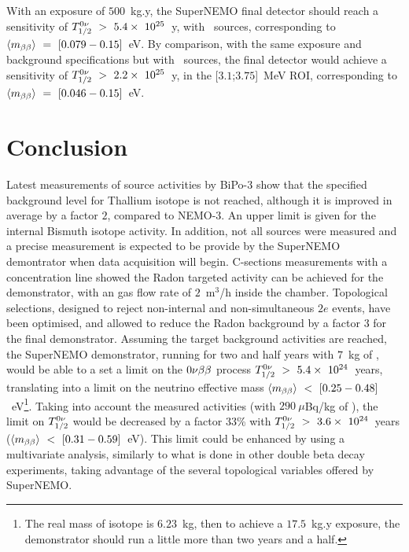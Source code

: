 With an exposure of $500$~kg.y, the SuperNEMO final detector should reach a sensitivity of $T_{1/2}^{0\nu}~>~5.4\times~10^{25}$~y, with \Se\ sources, corresponding to $\langle m_{\beta\beta}\rangle~=~[0.079-0.15]$~eV.
By comparison, with the same exposure and background specifications but with \Nd\ sources, the final detector would achieve a sensitivity of $T_{1/2}^{0\nu}~>~2.2\times~10^{25}$~y, in the [$3.1$;$3.75$]~MeV ROI, corresponding to $\langle m_{\beta\beta}\rangle~=~[0.046-0.15]$~eV.


\section{Conclusion}

Latest measurements of source activities by BiPo-$3$ show that the specified background level for Thallium isotope is not reached, although it is improved in average by a factor $2$, compared to NEMO-$3$.
An upper limit is given for the internal Bismuth isotope activity.
In addition, not all sources were measured and a precise measurement is expected to be provide by the SuperNEMO demontrator when data acquisition will begin.
C-sections measurements with a concentration line showed the Radon targeted activity can be achieved for the demonstrator, with an gas flow rate of $2$~m$^{3}$/h inside the chamber.
Topological selections, designed to reject non-internal and non-simultaneous $2e$ events, have been optimised, and allowed to reduce the Radon background by a factor $3$ for the final demonstrator.
Assuming the target background activities are reached, the SuperNEMO demonstrator, running for two and half years with $7$~kg of \Se, would be able to a set a limit on the $0\nu\beta\beta$ process $T_{1/2}^{0\nu}~>~5.4\times~10^{24}$~years, translating into a limit on the neutrino effective mass $\langle m_{\beta\beta}\rangle~<~[0.25-0.48]$~eV\footnote{The real mass of isotope is $6.23$~kg, then to achieve a $17.5$~kg.y exposure, the demonstrator should run a little more than two years and a half.}.
Taking into account the measured activities (with $290~\mu$Bq/kg of \Bi), the limit on $T_{1/2}^{0\nu}$ would be decreased by a factor $33$\% with $T_{1/2}^{0\nu}~>~3.6\times~10^{24}$~years ($\langle m_{\beta\beta}\rangle~<~[0.31-0.59]$~eV).
This limit could be enhanced by using a multivariate analysis, similarly to what is done in other double beta decay experiments, taking advantage of the several topological variables offered by SuperNEMO.

